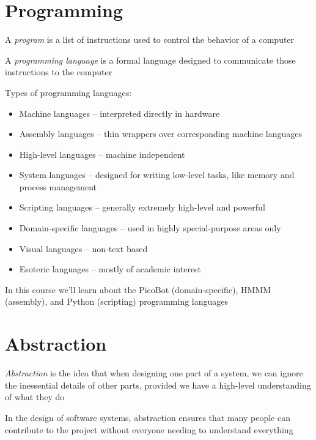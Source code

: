 \documentclass[8pt,a4paper,compress]{beamer}
\begin{document}
\section{Programming}
\begin{frame}[fragile]
A \emph{program} is a list of instructions used to control the behavior of a computer

\bigskip

A \emph{programming language} is a formal language designed to communicate those instructions to the computer

\bigskip

Types of programming languages:
\begin{itemize}
\item Machine languages -- interpreted directly in hardware
\item Assembly languages -- thin wrappers over corresponding machine languages
\item High-level languages -- machine independent
\item System languages -- designed for writing low-level tasks, like memory and process management
\item Scripting languages -- generally extremely high-level and powerful
\item Domain-specific languages -- used in highly special-purpose areas only
\item Visual languages -- non-text based
\item Esoteric languages -- mostly of academic interest
\end{itemize}

\bigskip

In this course we'll learn about the PicoBot (domain-specific), HMMM (assembly), and Python (scripting) programming languages
\end{frame}

\section{Abstraction}
\begin{frame}[fragile]
\emph{Abstraction} is the idea that when designing one part of a system, we can ignore the inessential details of other parts, provided we have a high-level understanding of what they do

\bigskip

In the design of software systems, abstraction ensures that many people can contribute to the project without everyone needing to understand everything
\end{frame}
\end{document}
